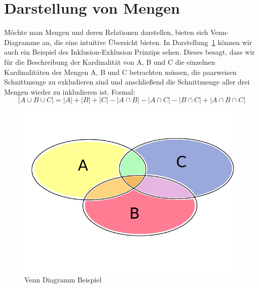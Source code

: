 \section{Darstellung von Mengen}
%
Möchte man Mengen und deren Relationen darstellen, bieten sich Venn-Diagramme an,
die eine intuitive Übersicht bieten. In Darstellung~\ref{fig:venn_diagram} können
wir auch ein Beispiel des Inklusion-Exklusion Prinzips sehen. Dieses besagt, dass
wir für die Beschreibung der Kardinalität von A, B und C die einzelnen Kardinalitäten
der Mengen A, B und C betrachten müssen, die paarweisen Schnittmenge zu exkludieren
sind und anschließend die Schnittmenge aller drei Mengen wieder zu inkludieren ist.
Formal:
\[
    |A \cup B \cup C| = |A| + |B| + |C| - |A \cap B| - |A \cap C|
        - |B \cap C| + |A \cap B \cap C|
\]
%
\begin{figure}[p]
 \begin{center}
  \includegraphics{img/venn_diagram_example.pdf}
  \caption{Venn Diagramm Beispiel}
  \label{fig:venn_diagram}
 \end{center}
\end{figure}

